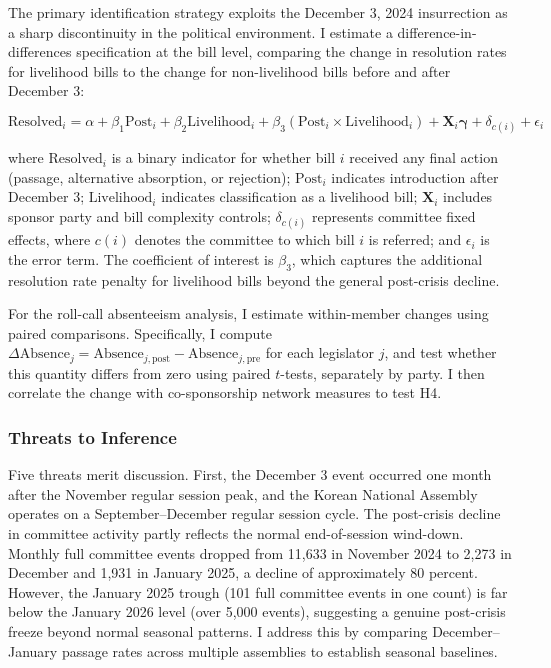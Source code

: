 \documentclass[11pt]{article}
\begin{document}
The primary identification strategy exploits the December 3, 2024 insurrection as a sharp discontinuity in the political environment. I estimate a difference-in-differences specification at the bill level, comparing the change in resolution rates for livelihood bills to the change for non-livelihood bills before and after December 3:

\begin{equation}
\text{Resolved}_{i} = \alpha + \beta_1 \text{Post}_{i} + \beta_2 \text{Livelihood}_{i} + \beta_3 (\text{Post}_{i} \times \text{Livelihood}_{i}) + \mathbf{X}_{i} \boldsymbol{\gamma} + \delta_{c(i)} + \epsilon_{i}
\label{eq:main}
\end{equation}

\noindent where $\text{Resolved}_{i}$ is a binary indicator for whether bill $i$ received any final action (passage, alternative absorption, or rejection); $\text{Post}_{i}$ indicates introduction after December 3; $\text{Livelihood}_{i}$ indicates classification as a livelihood bill; $\mathbf{X}_{i}$ includes sponsor party and bill complexity controls; $\delta_{c(i)}$ represents committee fixed effects, where $c(i)$ denotes the committee to which bill $i$ is referred; and $\epsilon_{i}$ is the error term. The coefficient of interest is $\beta_3$, which captures the additional resolution rate penalty for livelihood bills beyond the general post-crisis decline.

For the roll-call absenteeism analysis, I estimate within-member changes using paired comparisons. Specifically, I compute $\Delta \text{Absence}_{j} = \text{Absence}_{j,\text{post}} - \text{Absence}_{j,\text{pre}}$ for each legislator $j$, and test whether this quantity differs from zero using paired $t$-tests, separately by party. I then correlate the change with co-sponsorship network measures to test H4.

\subsubsection*{Threats to Inference}

Five threats merit discussion. First, the December 3 event occurred one month after the November regular session peak, and the Korean National Assembly operates on a September--December regular session cycle. The post-crisis decline in committee activity partly reflects the normal end-of-session wind-down. Monthly full committee events dropped from 11,633 in November 2024 to 2,273 in December and 1,931 in January 2025, a decline of approximately 80 percent. However, the January 2025 trough (101 full committee events in one count) is far below the January 2026 level (over 5,000 events), suggesting a genuine post-crisis freeze beyond normal seasonal patterns. I address this by comparing December--January passage rates across multiple assemblies to establish seasonal baselines.
\end{document}
